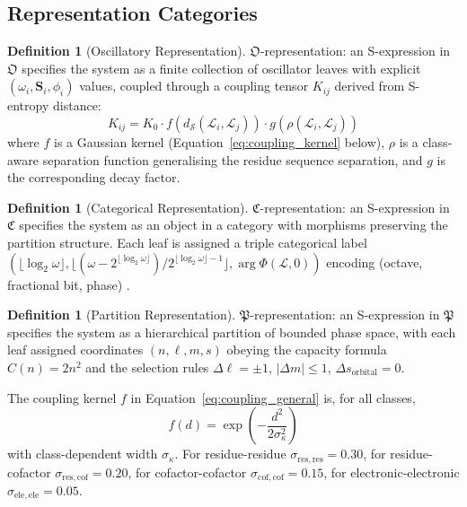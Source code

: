 \documentclass[11pt,twocolumn,a4paper]{article}
\theoremstyle{definition}
\newtheorem{definition}[theorem]{Definition}
\theoremstyle{remark}
\newcommand{\Sspace}{\mathcal{S}}
\newcommand{\Scoord}{\mathbf{S}}
\newcommand{\Osc}{\mathfrak{O}}
\newcommand{\Cat}{\mathfrak{C}}
\newcommand{\Part}{\mathfrak{P}}
\newcommand{\Leaf}{\mathcal{L}}
\begin{document}
\subsection{Representation Categories}

\begin{definition}[Oscillatory Representation]
\label{def:osc_rep}
$\Osc$-representation: an S-expression in $\Osc$ specifies the system as a finite collection of oscillator leaves with explicit $(\omega_i, \Scoord_i, \phi_i)$ values, coupled through a coupling tensor $K_{ij}$ derived from S-entropy distance:
\begin{equation}
K_{ij} = K_0 \cdot f(d_\Sspace(\Leaf_i, \Leaf_j)) \cdot g(\rho(\Leaf_i, \Leaf_j))
\label{eq:coupling_general}
\end{equation}
where $f$ is a Gaussian kernel (Equation~\eqref{eq:coupling_kernel} below), $\rho$ is a class-aware separation function generalising the residue sequence separation, and $g$ is the corresponding decay factor.
\end{definition}

\begin{definition}[Categorical Representation]
\label{def:cat_rep}
$\Cat$-representation: an S-expression in $\Cat$ specifies the system as an object in a category with morphisms preserving the partition structure. Each leaf is assigned a triple categorical label $(\lfloor \log_2 \omega \rfloor, \lfloor (\omega - 2^{\lfloor \log_2 \omega \rfloor}) / 2^{\lfloor \log_2 \omega \rfloor - 1} \rfloor, \arg \Phi(\Leaf, 0))$ encoding (octave, fractional bit, phase) \citep{sachikonye2025_partition, sachikonye2025_hyperfine}.
\end{definition}

\begin{definition}[Partition Representation]
\label{def:part_rep}
$\Part$-representation: an S-expression in $\Part$ specifies the system as a hierarchical partition of bounded phase space, with each leaf assigned coordinates $(n, \ell, m, s)$ obeying the capacity formula $C(n) = 2n^2$ and the selection rules $\Delta\ell = \pm 1$, $|\Delta m| \leq 1$, $\Delta s_{\mathrm{orbital}} = 0$.
\end{definition}

The coupling kernel $f$ in Equation~\eqref{eq:coupling_general} is, for all classes,
\begin{equation}
f(d) = \exp\!\left( - \frac{d^2}{2\sigma_\kappa^2} \right)
\label{eq:coupling_kernel}
\end{equation}
with class-dependent width $\sigma_\kappa$. For residue-residue $\sigma_{\mathrm{res,res}} = 0.30$, for residue-cofactor $\sigma_{\mathrm{res,cof}} = 0.20$, for cofactor-cofactor $\sigma_{\mathrm{cof,cof}} = 0.15$, for electronic-electronic $\sigma_{\mathrm{ele,ele}} = 0.05$.
\end{document}
